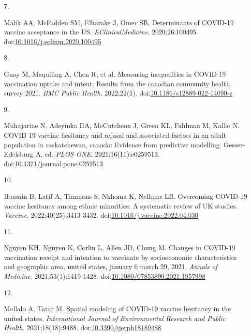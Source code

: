 \documentclass[
  letterpaper,
  DIV=11,
  numbers=noendperiod]{scrartcl}
\newlength{\cslhangindent}
\newlength{\csllabelwidth}
\newlength{\cslentryspacingunit} %
\newenvironment{CSLReferences}[2] %
 {%
  \setlength{\parindent}{0pt}
  \ifodd #1
  \let\oldpar\par
  \def\par{\hangindent=\cslhangindent\oldpar}
  \fi
  \setlength{\parskip}{#2\cslentryspacingunit}
 }%
 {}
\newcommand{\CSLLeftMargin}[1]{\parbox[t]{\csllabelwidth}{#1}}
\newcommand{\CSLRightInline}[1]{\parbox[t]{\linewidth - \csllabelwidth}{#1}\break}
\begin{document}
\begin{CSLReferences}{0}{0}
\leavevmode{}%
\CSLLeftMargin{7. }%
\CSLRightInline{Malik AA, McFadden SM, Elharake J, Omer SB. Determinants
of {COVID}-19 vaccine acceptance in the {US}.
\emph{{EClinicalMedicine}}. 2020;26:100495.
doi:\href{https://doi.org/10.1016/j.eclinm.2020.100495}{10.1016/j.eclinm.2020.100495}}

\leavevmode{}%
\CSLLeftMargin{8. }%
\CSLRightInline{Guay M, Maquiling A, Chen R, et al. Measuring
inequalities in {COVID}-19 vaccination uptake and intent: Results from
the canadian community health survey 2021. \emph{{BMC} Public Health}.
2022;22(1).
doi:\href{https://doi.org/10.1186/s12889-022-14090-z}{10.1186/s12889-022-14090-z}}

\leavevmode{}%
\CSLLeftMargin{9. }%
\CSLRightInline{Muhajarine N, Adeyinka DA, McCutcheon J, Green KL,
Fahlman M, Kallio N. {COVID}-19 vaccine hesitancy and refusal and
associated factors in an adult population in saskatchewan, canada:
Evidence from predictive modelling. Gesser-Edelsburg A, ed. \emph{{PLOS}
{ONE}}. 2021;16(11):e0259513.
doi:\href{https://doi.org/10.1371/journal.pone.0259513}{10.1371/journal.pone.0259513}}

\leavevmode{}%
\CSLLeftMargin{10. }%
\CSLRightInline{Hussain B, Latif A, Timmons S, Nkhoma K, Nellums LB.
Overcoming {COVID}-19 vaccine hesitancy among ethnic minorities: A
systematic review of {UK} studies. \emph{Vaccine}.
2022;40(25):3413-3432.
doi:\href{https://doi.org/10.1016/j.vaccine.2022.04.030}{10.1016/j.vaccine.2022.04.030}}

\leavevmode{}%
\CSLLeftMargin{11. }%
\CSLRightInline{Nguyen KH, Nguyen K, Corlin L, Allen JD, Chung M.
Changes in {COVID}-19 vaccination receipt and intention to vaccinate by
socioeconomic characteristics and geographic area, united states,
january 6 {\textendash} march 29, 2021. \emph{Annals of Medicine}.
2021;53(1):1419-1428.
doi:\href{https://doi.org/10.1080/07853890.2021.1957998}{10.1080/07853890.2021.1957998}}

\leavevmode{}%
\CSLLeftMargin{12. }%
\CSLRightInline{Mollalo A, Tatar M. Spatial modeling of {COVID}-19
vaccine hesitancy in the united states. \emph{International Journal of
Environmental Research and Public Health}. 2021;18(18):9488.
doi:\href{https://doi.org/10.3390/ijerph18189488}{10.3390/ijerph18189488}}


\end{CSLReferences}
\end{document}
